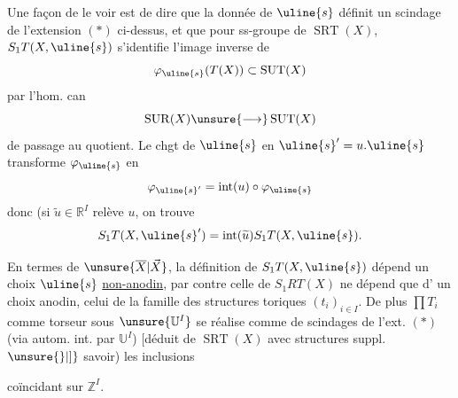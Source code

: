 
Une façon de le voir est de dire que
la donnée de $\uline{s}$ définit un scindage
 de
l'extension $(*)$ ci-dessus, et que  pour
ss-groupe de $\operatorname{SRT}(X)$,
$S_1T(X,\uline{s})$ s'identifie
 l'image inverse de
\[
\varphi_{\uline{s}}(T(X))\subset\operatorname{SUT}(X)
\]
par l'hom. can
\[
\operatorname{SUR}(X)\unsure{\longrightarrow}\operatorname{SUT}(X)
\]
de passage au quotient. Le chgt de
$\uline{s}$ en $\uline{s}'=u.\uline{s}$
transforme $\varphi_{\uline{s}}$ en
\[
\varphi_{\uline{s}'}=\operatorname{int}(u)\circ\varphi_{\uline{s}}
\]
donc (si $\widetilde u\in\mathbb R^I$ relève $u$, on trouve
\[
S_1T(X,\uline{s}')
=\operatorname{int}(\widetilde u)S_1T(X,\uline{s}).
\]

En termes de $\unsure{\overline X|\vec X}$, la définition de
$S_1T(X,\uline{s})$
dépend un choix $\uline{s}$ \uline{non-anodin},
par contre celle de $S_1RT(X)$ ne dépend que d'
un choix anodin, celui de la famille des
structures toriques $(t_i)_{i\in I}$.
De plus $\prod T_i$ comme
torseur sous $\unsure{\mathbb U^I}$ se réalise
comme  de scindages de l'ext. $(*)$
(via autom. int. par $\mathbb U^I$)
$\bigl[$déduit de $\operatorname{SRT}(X)$
avec  structures suppl.$\unsure{\}|]}$
savoir) les inclusions


coïncidant sur $\mathbb Z^I$.


